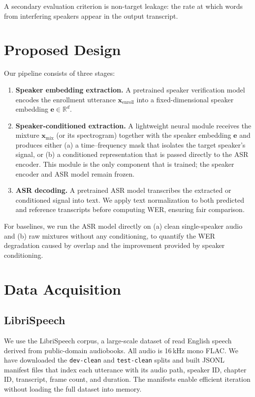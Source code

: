 \documentclass{article}
\begin{document}
A secondary evaluation criterion is non-target leakage: the rate at which words from interfering speakers appear in the output transcript.


\section{Proposed Design}

Our pipeline consists of three stages:

\begin{enumerate}
    \item \textbf{Speaker embedding extraction.} A pretrained speaker verification model encodes the enrollment utterance $\mathbf{x}_{\text{enroll}}$ into a fixed-dimensional speaker embedding $\mathbf{e} \in \mathbb{R}^d$.

    \item \textbf{Speaker-conditioned extraction.} A lightweight neural module receives the mixture $\mathbf{x}_{\text{mix}}$ (or its spectrogram) together with the speaker embedding $\mathbf{e}$ and produces either (a) a time--frequency mask that isolates the target speaker's signal, or (b) a conditioned representation that is passed directly to the ASR encoder. This module is the only component that is trained; the speaker encoder and ASR model remain frozen.

    \item \textbf{ASR decoding.} A pretrained ASR model transcribes the extracted or conditioned signal into text. We apply text normalization to both predicted and reference transcripts before computing WER, ensuring fair comparison.
\end{enumerate}

For baselines, we run the ASR model directly on (a) clean single-speaker audio and (b) raw mixtures without any conditioning, to quantify the WER degradation caused by overlap and the improvement provided by speaker conditioning.


\section{Data Acquisition}

\subsection{LibriSpeech}
We use the LibriSpeech corpus, a large-scale dataset of read English speech derived from public-domain audiobooks. All audio is 16\,kHz mono FLAC. We have downloaded the \texttt{dev-clean} and \texttt{test-clean} splits and built JSONL manifest files that index each utterance with its audio path, speaker ID, chapter ID, transcript, frame count, and duration. The manifests enable efficient iteration without loading the full dataset into memory.
\end{document}
